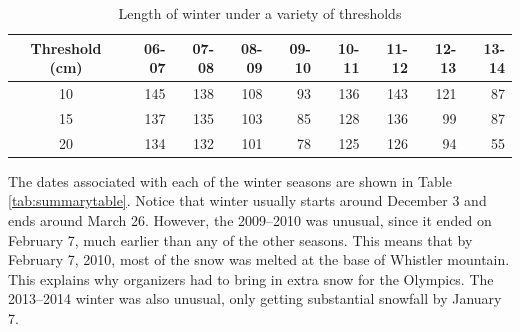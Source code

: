 \documentclass[12pt,twoside]{article}
\begin{document}
{%
\begin{table}[ht]
\centering
\begin{tabular}{c|rrrrrrrr}
  \hline
Threshold (cm) & 06-07 & 07-08 & 08-09 & 09-10 & 10-11 & 11-12 & 12-13 & 13-14 \\ 
  \hline
10 & 145 & 138 & 108 & 93 & 136 & 143 & 121 & 87 \\ 
  15 & 137 & 135 & 103 & 85 & 128 & 136 & 99 & 87 \\ 
  20 & 134 & 132 & 101 & 78 & 125 & 126 & 94 & 55 \\ 
   \hline
\end{tabular}
\caption{Length of winter under a variety of thresholds} 
\label{tab:robustcheck}
\end{table}
\medskip
The dates associated with each of the winter  seasons are shown in Table \ref{tab:summarytable}. Notice that winter usually starts around December 3 and ends around March 26. However, the 2009--2010 was unusual, since it ended on February 7, much earlier than any of the other seasons. This means that by February 7, 2010, most of the snow was melted at the base of Whistler mountain. This explains why organizers had to bring in extra snow for the Olympics. The 2013--2014 winter was also unusual, only getting substantial snowfall by January 7.

}
\end{document}
